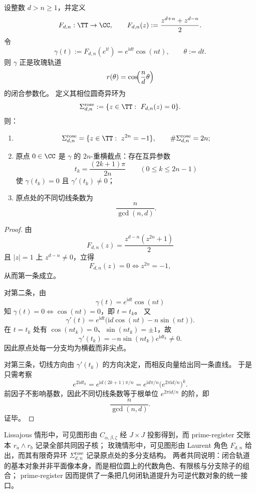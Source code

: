 \begin{theorem}\label{thm:cdim-rose-laurent-character-finite-singular-ring}
设整数 \(d>n\ge 1\)，并定义
\[
F_{d,n}:\TT\to\CC,\qquad
F_{d,n}(z):=\frac{z^{d+n}+z^{d-n}}{2}.
\]
令
\[
\gamma(t):=F_{d,n}(e^{\mathrm{i}t})=e^{\mathrm{i}dt}\cos(nt),
\qquad
\theta:=dt.
\]
则 \(\gamma\) 正是玫瑰轨道
\[
r(\theta)=\cos\!\Bigl(\frac{n}{d}\theta\Bigr)
\]
的闭合参数化。
定义其相位圆奇异环为
\[
\Sigma^{\mathrm{rose}}_{d,n}:=\{z\in\TT:\ F_{d,n}(z)=0\}.
\]
则：
\begin{enumerate}
  \item
  \[
  \Sigma^{\mathrm{rose}}_{d,n}=\{z\in\TT:\ z^{2n}=-1\},
  \qquad
  \#\Sigma^{\mathrm{rose}}_{d,n}=2n;
  \]
  \item 原点 \(0\in\CC\) 是 \(\gamma\) 的 \(2n\)-重横截点：存在互异参数
  \[
  t_k=\frac{(2k+1)\pi}{2n}\qquad(0\le k\le 2n-1)
  \]
  使 \(\gamma(t_k)=0\) 且 \(\gamma'(t_k)\neq 0\)；
  \item 原点处的不同切线条数为
  \[
  \frac{n}{\gcd(n,d)}.
  \]
\end{enumerate}
\end{theorem}
\begin{proof}
由
\[
F_{d,n}(z)=\frac{z^{d-n}(z^{2n}+1)}{2}
\]
且 \(|z|=1\) 上 \(z^{d-n}\neq 0\)，立得
\[
F_{d,n}(z)=0 \iff z^{2n}=-1,
\]
从而第一条成立。
\par
对第二条，由
\[
\gamma(t)=e^{\mathrm{i}dt}\cos(nt)
\]
知 \(\gamma(t)=0\iff \cos(nt)=0\)，即 \(t=t_k\)。
又
\[
\gamma'(t)=e^{\mathrm{i}dt}\bigl(\mathrm{i}d\cos(nt)-n\sin(nt)\bigr).
\]
在 \(t=t_k\) 处有 \(\cos(nt_k)=0\)、\(\sin(nt_k)=\pm1\)，故
\[
\gamma'(t_k)=-n\sin(nt_k)e^{\mathrm{i}dt_k}\neq 0.
\]
因此原点处每一分支均为横截而非尖点。
\par
对第三条，切线方向由 \(\gamma'(t_k)\) 的方向决定，而相反向量给出同一条直线。
于是只需考察
\[
e^{2\mathrm{i}dt_k}
=
e^{\mathrm{i}d(2k+1)\pi/n}
=
e^{\mathrm{i}d\pi/n}\bigl(e^{2\pi\mathrm{i}d/n}\bigr)^k.
\]
前因子不影响基数，因此不同切线条数等于根单位 \(e^{2\pi\mathrm{i}d/n}\) 的阶，即
\[
\frac{n}{\gcd(n,d)}.
\]
证毕。
\end{proof}

\begin{remark}[闭轨道的可逆提升范式]\label{rem:cdim-closed-trajectory-reversible-lift}
Lissajous 情形中，可见图形由 \(C_{\alpha,\beta,\zeta}\) 经 \(J\times J\) 投影得到，而 prime-register 交账本 \(r_a\wedge r_b\) 记录全部共同因子核；
玫瑰情形中，可见图形由 Laurent 角色 \(F_{d,n}\) 给出，而其有限奇异环 \(\Sigma^{\mathrm{rose}}_{d,n}\) 记录原点处的多分支结构。
两者共同说明：闭合轨道的基本对象并非平面像本身，而是相位圆上的代数角色、有限核与分支除子的组合；
prime-register 因而提供了一条把几何闭轨道提升为可逆代数对象的统一接口。
\end{remark}

